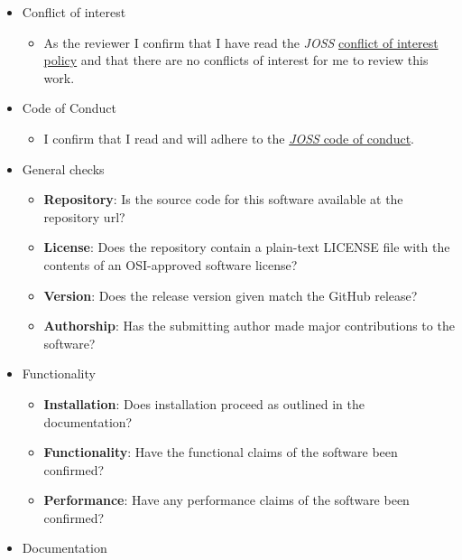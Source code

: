\documentclass{article}
\newcommand\joss{\textit{JOSS}}
\begin{document}
\begin{itemize}
\item Conflict of interest

\begin{itemize}
    \item As the reviewer I confirm that
    I have read the \joss{} \href{https://github.com/openjournals/joss/blob/master/COI.md}{conflict of interest policy}
    and that there are no conflicts of interest for me to review this work.
\end{itemize}

\item Code of Conduct
\begin{itemize}
    \item I confirm that I read and will adhere to the \href{http://joss.theoj.org/about#code_of_conduct}{\joss{} code of conduct}.
\end{itemize}

\item General checks

\begin{itemize}
    \item \textbf{Repository}: Is the source code for this software available at the repository url?
    \item \textbf{License}: Does the repository contain a plain-text LICENSE file with the contents of an OSI-approved software license?
    \item \textbf{Version}: Does the release version given match the GitHub release?
    \item \textbf{Authorship}: Has the submitting author made major contributions to the software?
\end{itemize}

\item Functionality

\begin{itemize}
    \item \textbf{Installation}: Does installation proceed as outlined in the documentation?
    \item \textbf{Functionality}: Have the functional claims of the software been confirmed?
    \item \textbf{Performance}: Have any performance claims of the software been confirmed?
\end{itemize}


\item Documentation


\end{itemize}
\end{document}
